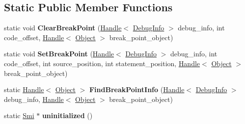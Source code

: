 \subsection*{Static Public Member Functions}
\begin{DoxyCompactItemize}
\item 
static void {\bfseries Clear\+Break\+Point} (\hyperlink{classv8_1_1internal_1_1_handle}{Handle}$<$ \hyperlink{classv8_1_1internal_1_1_debug_info}{Debug\+Info} $>$ debug\+\_\+info, int code\+\_\+offset, \hyperlink{classv8_1_1internal_1_1_handle}{Handle}$<$ \hyperlink{classv8_1_1internal_1_1_object}{Object} $>$ break\+\_\+point\+\_\+object)\hypertarget{classv8_1_1internal_1_1_debug_info_ad29f62c2c7ba1faeeda97d128a4bcdf0}{}\label{classv8_1_1internal_1_1_debug_info_ad29f62c2c7ba1faeeda97d128a4bcdf0}

\item 
static void {\bfseries Set\+Break\+Point} (\hyperlink{classv8_1_1internal_1_1_handle}{Handle}$<$ \hyperlink{classv8_1_1internal_1_1_debug_info}{Debug\+Info} $>$ debug\+\_\+info, int code\+\_\+offset, int source\+\_\+position, int statement\+\_\+position, \hyperlink{classv8_1_1internal_1_1_handle}{Handle}$<$ \hyperlink{classv8_1_1internal_1_1_object}{Object} $>$ break\+\_\+point\+\_\+object)\hypertarget{classv8_1_1internal_1_1_debug_info_aca9ad909ebf64df8047d6c6f22166f5a}{}\label{classv8_1_1internal_1_1_debug_info_aca9ad909ebf64df8047d6c6f22166f5a}

\item 
static \hyperlink{classv8_1_1internal_1_1_handle}{Handle}$<$ \hyperlink{classv8_1_1internal_1_1_object}{Object} $>$ {\bfseries Find\+Break\+Point\+Info} (\hyperlink{classv8_1_1internal_1_1_handle}{Handle}$<$ \hyperlink{classv8_1_1internal_1_1_debug_info}{Debug\+Info} $>$ debug\+\_\+info, \hyperlink{classv8_1_1internal_1_1_handle}{Handle}$<$ \hyperlink{classv8_1_1internal_1_1_object}{Object} $>$ break\+\_\+point\+\_\+object)\hypertarget{classv8_1_1internal_1_1_debug_info_a868fd2eb9dcd4996a69f0d7b1813d60e}{}\label{classv8_1_1internal_1_1_debug_info_a868fd2eb9dcd4996a69f0d7b1813d60e}

\item 
static \hyperlink{classv8_1_1internal_1_1_smi}{Smi} $\ast$ {\bfseries uninitialized} ()\hypertarget{classv8_1_1internal_1_1_debug_info_aaf1401d9f61bf57d0a263b1367f8a646}{}\label{classv8_1_1internal_1_1_debug_info_aaf1401d9f61bf57d0a263b1367f8a646}

\end{DoxyCompactItemize}
